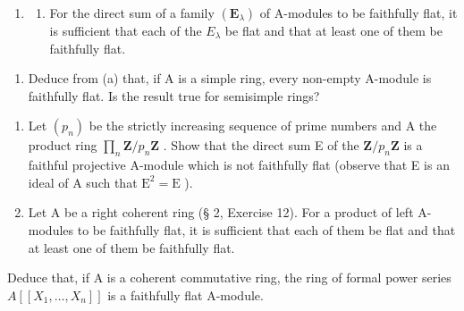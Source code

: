 
\begin{enumerate}
\def\labelenumi{\arabic{enumi}.}
\tightlist
\item
  \begin{enumerate}
  \def\labelenumii{(\alph{enumii})}
  \tightlist
  \item
    For the direct sum of a family \((\mathbf{E}_{\lambda})\) of A-modules to be faithfully flat, it is sufficient that each of the \(E_{\lambda}\) be flat and that at least one of them be faithfully flat.
  \end{enumerate}
\end{enumerate}

\begin{enumerate}
\def\labelenumi{(\alph{enumi})}
\setcounter{enumi}{1}
\tightlist
\item
  Deduce from (a) that, if A is a simple ring, every non-empty A-module is faithfully flat. Is the result true for semisimple rings?
\end{enumerate}

\begin{enumerate}
\def\labelenumi{\arabic{enumi}.}
\setcounter{enumi}{1}
\item
  Let \((p_n)\) be the strictly increasing sequence of prime numbers and A the product ring \(\prod_{n} \mathbf{Z} / p_n \mathbf{Z}\) . Show that the direct sum E of the \(\mathbf{Z} / p_n \mathbf{Z}\) is a faithful projective A-module which is not faithfully flat (observe that E is an ideal of A such that \(\mathrm{E}^2 = \mathrm{E}\) ).
\item
  Let A be a right coherent ring (§ 2, Exercise 12). For a product of left A-modules to be faithfully flat, it is sufficient that each of them be flat and that at least one of them be faithfully flat.
\end{enumerate}

Deduce that, if A is a coherent commutative ring, the ring of formal power series \(A[[X_{1},\ldots,X_{n}]]\) is a faithfully flat A-module.

